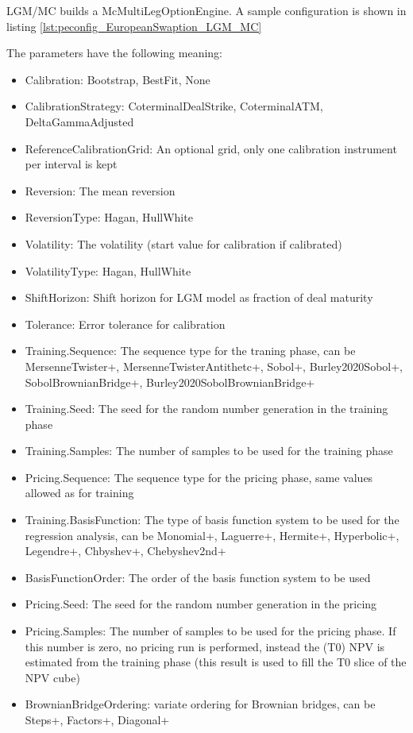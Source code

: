 LGM/MC builds a McMultiLegOptionEngine. A sample configuration is shown in
listing \ref{lst:peconfig_EuropeanSwaption_LGM_MC}

The parameters have the following meaning:

\begin{itemize}
\item Calibration: Bootstrap, BestFit, None
\item CalibrationStrategy: CoterminalDealStrike, CoterminalATM, DeltaGammaAdjusted
\item ReferenceCalibrationGrid: An optional grid, only one calibration instrument per interval is kept
\item Reversion: The mean reversion
\item ReversionType: Hagan, HullWhite
\item Volatility: The volatility (start value for calibration if calibrated)
\item VolatilityType: Hagan, HullWhite
\item ShiftHorizon: Shift horizon for LGM model as fraction of deal maturity
\item Tolerance: Error tolerance for calibration
\item Training.Sequence: The sequence type for the traning phase, can be MersenneTwister+, MersenneTwisterAntithetc+,
  Sobol+, Burley2020Sobol+, SobolBrownianBridge+, Burley2020SobolBrownianBridge+
\item Training.Seed: The seed for the random number generation in the training phase
\item Training.Samples: The number of samples to be used for the training phase
\item Pricing.Sequence: The sequence type for the pricing phase, same values allowed as for training
\item Training.BasisFunction: The type of basis function system to be used for the regression analysis, can be
  Monomial+, Laguerre+, Hermite+, Hyperbolic+, Legendre+, Chbyshev+, Chebyshev2nd+
\item BasisFunctionOrder: The order of the basis function system to be used
\item Pricing.Seed: The seed for the random number generation in the pricing
\item Pricing.Samples: The number of samples to be used for the pricing phase. If this number is zero, no pricing run is
  performed, instead the (T0) NPV is estimated from the training phase (this result is used to fill the T0 slice of the
  NPV cube)
\item BrownianBridgeOrdering: variate ordering for Brownian bridges, can be Steps+, Factors+, Diagonal+

\end{itemize}
